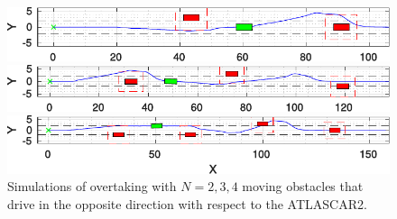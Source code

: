 \begin{figure}[!h]
	\centering
	\begin{minipage}[t]{\textwidth}
		\includegraphics[width=\textwidth]{./figure/random_N_obstacles/overtaking_random_2.pdf}
	\end{minipage}
	\begin{minipage}[t]{\textwidth}
		\includegraphics[width=\textwidth]{./figure/random_N_obstacles/overtaking_random.pdf}
	\end{minipage}
	\begin{minipage}[t]{\textwidth}
		\includegraphics[width=\textwidth]{./figure/random_N_obstacles/overtaking_random_1.pdf}
	\end{minipage}
	\caption{Simulations of overtaking with $N = 2,3,4$ moving obstacles that drive in the opposite direction with respect to the ATLASCAR2.}
	\label{fig:obstacleAvoidance_random}
\end{figure}


